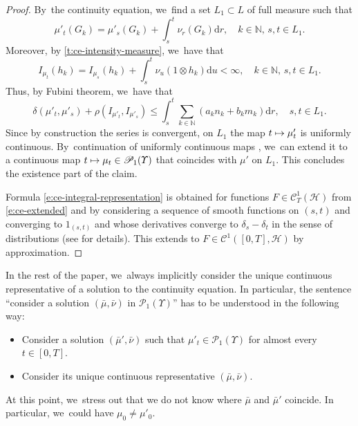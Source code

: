\documentclass[JEP,XML,SOM,Unicode,published]{cedram}
\newcommand\mto{\mathchoice{\longmapsto}{\mapsto}{\mapsto}{\mapsto}}
\theoremstyle{definition}
\theoremstyle{remark}
\begin{document}
\begin{proof}
By~the continuity equation, we~find a set $L_{1} \subset L$ of full measure such that
\begin{equation*}
\mu'_{t}(G_{k}) = \mu'_{s}(G_{k}) + \int_{s}^{t} \nu_{r}(G_{k}) \mathrm{d} r, \quad k \in \mathbb{N},\, s,t \in L_{1}.
\end{equation*}
Moreover, by \cref{t:ce-intensity-measure}, we~have that
\begin{equation*}
I_{\mu_{t}}(h_{k}) = I_{\mu_{s}}(h_{k}) + \int_{s}^{t} \nu_{u}(1 \otimes h_{k}) \mathrm{d} u < \infty, \quad k \in \mathbb{N},\, s,t \in L_{1}.
\end{equation*}
Thus, by Fubini theorem, we~have that
\begin{equation*}
\delta(\mu'_{t}, \mu'_{s}) + \rho(I_{\mu'_{t}}, I_{\mu'_{s}}) \leq \int_{s}^{t} \sum_{k \in \mathbb{N}} (a_{k} n_{k} + b_{k} m_{k}) \mathrm{d} r, \quad s,t \in L_{1}.
\end{equation*}
Since by construction the series is convergent, on $L_{1}$ the map $t \mto \mu'_{t}$ is uniformly continuous.
By~continuation of uniformly continuous maps \cite[Th.\,2, p.\,II.20]{BourbakiTopo}, we~can extend it to a continuous map $t \mto \mu_{t} \in \mathscr{P}_{1}(\varUpsilon)$ that coincides with $\mu'$ on $L_{1}$.
This concludes the existence part of the claim.

Formula \cref{e:ce-integral-representation} is obtained for functions $F \in \mathscr{C}_{T}^{1}(\mathscr{H})$ from \cref{e:ce-extended} and by considering a sequence of smooth functions on $(s, t)$ and converging to $1_{(s, t)}$ and whose derivatives converge to $\delta_{s} - \delta_{t}$ in the sense of distributions (see \cite[Lem.\,3.1]{Erbar} for details).
This extends to $F \in \mathscr{C}^{1}([0,T], \mathscr{H})$ by approximation.
\end{proof}

In the rest of the paper, we~always implicitly consider the unique continuous representative of a solution to the continuity equation.
In particular, the sentence \enquote{consider a solution $(\bar{\mu}, \bar{\nu})$ in $\mathscr{P}_{1}(\varUpsilon)$} has to be understood in the following way:
\begin{itemize}[wide]
\item Consider a solution $(\bar{\mu}', \bar{\nu})$ such that $\mu'_{t} \in \mathscr{P}_{1}(\varUpsilon)$ for almost every $t \in [0,T]$.
\item Consider its unique continuous representative $(\bar{\mu}, \bar{\nu})$.
\end{itemize}
At this point, we~stress out that we do not know where $\bar{\mu}$ and $\bar{\mu}'$ coincide.
In particular, we~could have $\mu_{0} \ne \mu'_{0}$.
\end{document}
